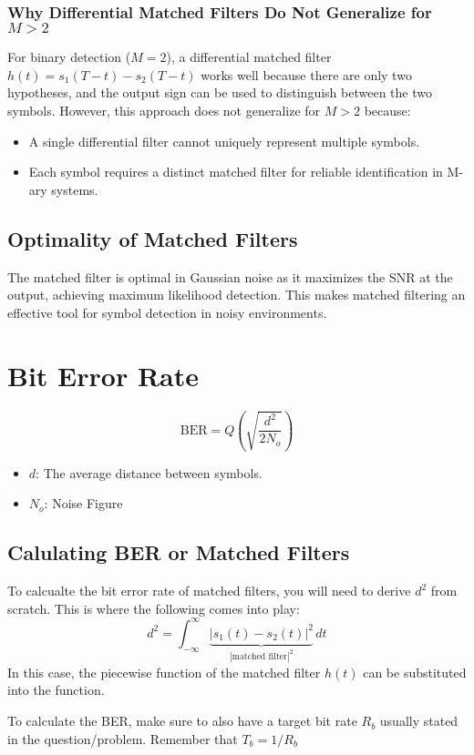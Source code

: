 \documentclass[10pt]{article}
\begin{document}
\subsubsection{Why Differential Matched Filters Do Not Generalize for \( M > 2 \)}
For binary detection (\( M = 2 \)), a differential matched filter \( h(t) = s_1(T - t) - s_2(T - t) \) works well because there are only two hypotheses, and the output sign can be used to distinguish between the two symbols. However, this approach does not generalize for \( M > 2 \) because:
\begin{itemize}
    \item A single differential filter cannot uniquely represent multiple symbols.
    \item Each symbol requires a distinct matched filter for reliable identification in M-ary systems.
\end{itemize}

\subsection{Optimality of Matched Filters}
The matched filter is optimal in Gaussian noise as it maximizes the SNR at the output, achieving maximum likelihood detection. This makes matched filtering an effective tool for symbol detection in noisy environments.

\section{Bit Error Rate}
\[
    \text{BER} = Q\left(\sqrt{\frac{d^2}{2N_o}}\right)
\]
\begin{itemize}
    \item $d$: The average distance between symbols. 
    \item $N_o$: Noise Figure
\end{itemize}
\subsection{Calulating BER or Matched Filters}
To calcualte the bit error rate of matched filters, you will need to derive $d^2$ from scratch. This is where the following comes into play:
\[
    d^2 = \int_{-\infty}^{\infty} \underbrace{\left|s_1(t) - s_2(t)\right| ^2}_{|\text{matched filter}|^2}\,dt
\]
In this case, the piecewise function of the matched filter $h(t)$ can be substituted into the function. 

To calculate the BER, make sure to also have a target bit rate $R_b$ usually stated in the question/problem. Remember that $T_b = 1/R_b$
\end{document}
